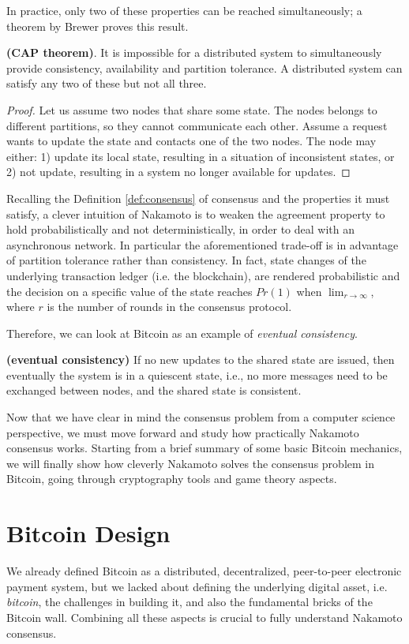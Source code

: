 \bigskip
\noindent
In practice, only two of these properties can be reached simultaneously; a theorem by Brewer proves this result.
\begin{thm} {\bf (CAP theorem)}.
    It is impossible for a distributed system to simultaneously provide consistency, availability and partition tolerance. A distributed system can satisfy any two of these but not all three.
\end{thm}
\begin{proof}
    Let us assume two nodes that share some state. The nodes belongs to different partitions, so they cannot communicate each other. Assume a request wants to update the state and contacts one of the two nodes. The node may either: 1) update its local state, resulting in a situation of inconsistent states, or 2) not update, resulting in a system no longer available for updates.
\end{proof}

\bigskip
\noindent
Recalling the Definition \ref{def:consensus} of consensus and the properties it must satisfy, a clever intuition of Nakamoto is to weaken the agreement property to hold probabilistically and not deterministically, in order to deal with an asynchronous network. In particular the aforementioned trade-off is in advantage of partition tolerance rather than consistency. In fact, state changes of the underlying transaction ledger (i.e. the blockchain), are rendered probabilistic and the decision on a specific value of the state reaches $Pr(1)$ when $\lim_{r \to \infty}$, where $r$ is the number of rounds in the consensus protocol.

\bigskip
\noindent
Therefore, we can look at Bitcoin as an example of \textit{eventual consistency}.
\begin{mydef}{\bf (eventual consistency)}
    If no new updates to the shared state are issued, then eventually the system is in a quiescent state, i.e., no more messages need to be exchanged between nodes, and the shared state is consistent.
\end{mydef}

\bigskip
\noindent
Now that we have clear in mind the consensus problem from a computer science perspective, we must move forward and study how practically Nakamoto consensus works. Starting from a brief summary of some basic Bitcoin mechanics, we will finally show how cleverly Nakamoto solves the consensus problem in Bitcoin, going through cryptography tools and game theory aspects.

\bigskip
\section{Bitcoin Design}
We already defined Bitcoin as a distributed, decentralized, peer-to-peer electronic payment system, but we lacked about defining the underlying digital asset, i.e. \textit{bitcoin}, the challenges in building it, and also the fundamental bricks of the Bitcoin wall. Combining all these aspects is crucial to fully understand Nakamoto consensus.

